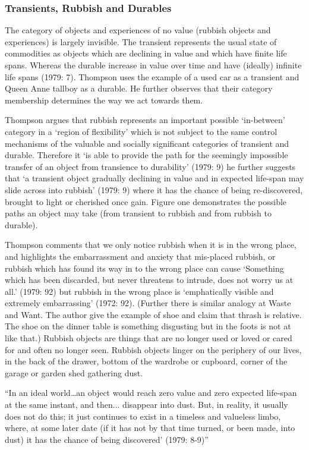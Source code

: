 \documentclass[12pt]{article}
\providecommand{\quotes}[1]{``#1''}
\begin{document}
\subsubsection{Transients, Rubbish and Durables}
The category of objects and experiences of no value (rubbish objects and experiences) is largely invisible. The transient represents the usual state of commodities as objects which are declining in value and which have finite life spans. Whereas the durable increase in value over time and have (ideally) infinite life spans (1979: 7). Thompson uses the example of a used car as a transient and Queen Anne tallboy as a durable. He further observes that their category membership determines the way we act towards them. 

Thompson argues that rubbish represents an important possible ‘in-between’ category in a ‘region of flexibility’ which is not subject to the same control mechanisms of the valuable and socially significant categories of transient and durable. Therefore it ‘is able to provide the path for the seemingly impossible transfer of an object from transience to durability’ (1979: 9) he further suggests that ‘a transient object gradually declining in value and in expected life-span may slide across into rubbish’ (1979: 9) where it has the chance of being re-discovered, brought to light or cherished once gain. Figure one demonstrates the possible paths an object may take (from transient to rubbish and from rubbish to durable). 

Thompson comments that we only notice rubbish when it is in the wrong place, and highlights the embarrassment and anxiety that mis-placed rubbish, or rubbish which has found its way in to the wrong place can cause ‘Something which has been discarded, but never threatens to intrude, does not worry us at all.’ (1979: 92) but rubbish in the wrong place is ‘emphatically visible and extremely embarrassing’ (1972: 92). (Further there is similar analogy at Waste and Want. The author give the example of shoe and claim that thrash is relative. The shoe on the dinner table is something disgusting but in the foots is not at like that.) Rubbish objects are things that are no longer used or loved or cared for and often no longer seen. Rubbish objects linger on the periphery of our lives, in the back of the drawer, bottom of the wardrobe or cupboard, corner of the garage or garden shed gathering dust.

\quotes{In an ideal world\ldots an object would reach zero value and zero expected life-span at the same instant, and then... disappear into dust. But, in reality, it usually does not do this; it just continues to exist in a timeless and valueless limbo, where, at some later date (if it has not by that time turned, or been made, into dust) it has the chance of being discovered’ (1979: 8-9)}
\end{document}
